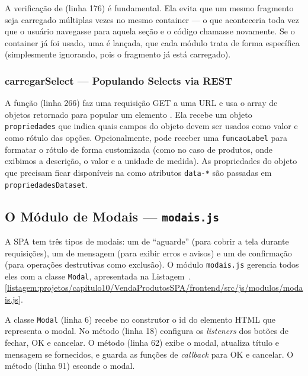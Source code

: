A verificação de  (linha 176) é fundamental. Ela evita que um mesmo fragmento seja carregado múltiplas vezes no mesmo container --- o que aconteceria toda vez que o usuário navegasse para aquela seção e o código chamasse  novamente. Se o container já foi usado, uma  é lançada, que cada módulo trata de forma específica (simplesmente ignorando, pois o fragmento já está carregado).

\subsubsection{carregarSelect --- Populando Selects via REST}

A função  (linha 266) faz uma requisição GET a uma URL e usa o array de objetos retornado para popular um elemento . Ela recebe um objeto \texttt{propriedades} que indica quais campos do objeto devem ser usados como valor e como rótulo das opções. Opcionalmente, pode receber uma \texttt{funcaoLabel} para formatar o rótulo de forma customizada (como no caso de produtos, onde exibimos a descrição, o valor e a unidade de medida). As propriedades do objeto que precisam ficar disponíveis na  como atributos \texttt{data-*} são passadas em \texttt{propriedadesDataset}.


\subsection{O Módulo de Modais --- \texttt{modais.js}}

A SPA tem três tipos de modais: um de ``aguarde'' (para cobrir a tela durante requisições), um de mensagem (para exibir erros e avisos) e um de confirmação (para operações destrutivas como exclusão). O módulo \texttt{modais.js} gerencia todos eles com a classe \texttt{Modal}, apresentada na Listagem~\thechapter.\ref{listagem:projetos/capitulo10/VendaProdutosSPA/frontend/src/js/modulos/modais.js}.


A classe \texttt{Modal} (linha 6) recebe no construtor o id do elemento HTML que representa o modal. No método  (linha 18) configura os \textit{listeners} dos botões de fechar, OK e cancelar. O método  (linha 62) exibe o modal, atualiza título e mensagem se fornecidos, e guarda as funções de \textit{callback} para OK e cancelar. O método  (linha 91) esconde o modal.

